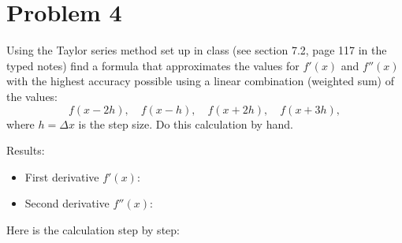 \section{Problem 4}%
\label{sec:problem_4}
Using the Taylor series method set up in class (see section 7.2, page 117 in the typed notes) find a formula that approximates the values for $f'(x)$ and $f''(x)$ with the highest accuracy possible using a linear combination (weighted sum) of the values:
\begin{equation*}
  f(x - 2h), \quad f(x - h), \quad f(x + 2h), \quad f(x + 3h),
\end{equation*}
where $h = \Delta x$ is the step size. Do this calculation by hand.
\begin{solution}
  Results:
  \begin{itemize}
    \item First derivative $f'(x)$:
      \\[1cm]            %
    \item Second derivative $f''(x)$:
      \\[1cm]            %
  \end{itemize}
  Here is the calculation step by step:
  \newpage \quad \vfill  %
\end{solution}

